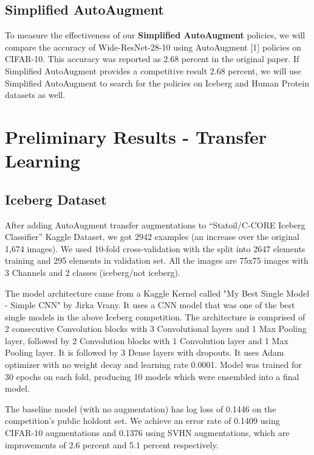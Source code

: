 \documentclass[10pt,twocolumn,letterpaper]{article}
\begin{document}
\subsection{Simplified AutoAugment}

To measure the effectiveness of our \textbf{Simplified AutoAugment} policies, we will compare the accuracy of Wide-ResNet-28-10 using AutoAugment [1] policies on CIFAR-10.  This accuracy was reported as 2.68 percent in the original paper.  If Simplified AutoAugment provides a competitive result 2.68 percent, we will use Simplified AutoAugment to search for the policies on Iceberg and Human Protein datasets as well.



\section{Preliminary Results - Transfer Learning}

\subsection{Iceberg Dataset}

After adding AutoAugment transfer augmentations to “Statoil/C-CORE Iceberg Classifier” Kaggle Dataset, we got 2942 examples (an increase over the original 1,674 images). We used 10-fold cross-validation with the split into 2647 elements training and 295 elements in validation set. All the images are 75x75 images with 3 Channels and 2 classes (iceberg/not iceberg).

The model architecture came from a Kaggle Kernel called "My Best Single Model - Simple CNN" by Jirka Vrany.  It uses a CNN model that was one of the best single models in the above Iceberg competition. The architecture is comprised of 2 consecutive Convolution blocks with 3 Convolutional layers and 1 Max Pooling layer, followed by 2 Convolution blocks with 1 Convolution layer and 1 Max Pooling layer. It is followed by 3 Dense layers with dropouts. It uses Adam optimizer with no weight decay and learning rate 0.0001. Model was trained for 30 epochs on each fold, producing 10 models which were ensembled into a final model.

The baseline model (with no augmentation) has log loss of 0.1446 on the competition's public holdout set. We achieve an error rate of 0.1409 using CIFAR-10 augmentations and 0.1376 using SVHN augmentations, which are improvements of 2.6 percent and 5.1 percent respectively.
\end{document}
